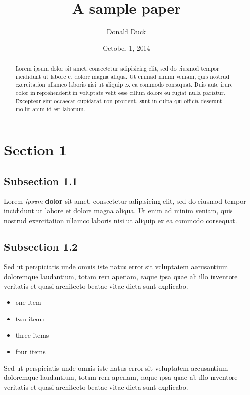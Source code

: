 \documentclass[a4paper,12pt]{article}
\title{A sample paper}
\author{Donald Duck}
\date{October 1, 2014}
\begin{document}
\maketitle
\begin{abstract}
Lorem ipsum dolor sit amet, consectetur adipisicing elit, sed do eiusmod
tempor incididunt ut labore et dolore magna aliqua. Ut enimad minim
veniam, quis nostrud exercitation ullamco laboris nisi ut aliquip ex ea
commodo consequat. Duis aute irure dolor in reprehenderit in voluptate
velit esse cillum dolore eu fugiat nulla pariatur. Excepteur sint
occaecat cupidatat non proident, sunt in culpa qui officia deserunt
mollit anim id est laborum.
\end{abstract}

\section{Section 1}\label{section-1}

\subsection{Subsection 1.1}\label{subsection-1.1}

Lorem \emph{ipsum} \textbf{dolor} sit amet, consectetur adipisicing
elit, sed do eiusmod tempor incididunt ut labore et dolore magna aliqua.
Ut enim ad minim veniam, quis nostrud exercitation ullamco laboris nisi
ut aliquip ex ea commodo consequat.

\subsection{Subsection 1.2}\label{subsection-1.2}

Sed ut perspiciatis unde omnis iste natus error sit voluptatem
accusantium doloremque laudantium, totam rem aperiam, eaque ipsa quae ab
illo inventore veritatis et quasi architecto beatae vitae dicta sunt
explicabo.

\begin{itemize}
\item
  one item
\item
  two items
\item
  three items
\item
  four items
\end{itemize}

Sed ut perspiciatis unde omnis iste natus error sit voluptatem
accusantium doloremque laudantium, totam rem aperiam, eaque ipsa quae ab
illo inventore veritatis et quasi architecto beatae vitae dicta sunt
explicabo.
\end{document}
